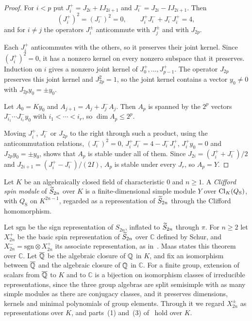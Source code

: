 \begin{proof}
For $i<p$ put $J_i^+=J_{2i}+IJ_{2i+1}$ and $J_i^-=J_{2i}-IJ_{2i+1}$. Then
\[
{(J_i^+)}^2={(J_i^-)}^2=0,\qquad J_i^+J_i^-+J_i^-J_i^+=4,
\]
and for $i\ne j$ the operators $J_i^\pm$ anticommute with $J_j^\pm$ and with $J_{2p}$.

Each $J_i^+$ anticommutes with the others, so it preserves their joint kernel. Since ${(J_i^+)}^2=0$, it has a nonzero kernel on every nonzero subspace that it preserves. Induction on $i$ gives a nonzero joint kernel of $J_0^+,\dots,J_{p-1}^+$. The operator $J_{2p}$ preserves this joint kernel and $J_{2p}^2=1$, so the joint kernel contains a vector $y_0\ne0$ with $J_{2p}y_0=\pm y_0$.

Let $A_0=Ky_0$ and $A_{j+1}=A_j+J_j^-A_j$. Then $A_p$ is spanned by the $2^p$ vectors $J_{i_1}^-\cdots J_{i_r}^-y_0$ with $i_1<\cdots<i_r$, so $\dim A_p\le2^p$.

Moving $J_i^+$, $J_i^-$ or $J_{2p}$ to the right through such a product, using the anticommutation relations, ${(J_i^-)}^2=0$, $J_i^+J_i^-=4-J_i^-J_i^+$, $J_i^+y_0=0$ and $J_{2p}y_0=\pm y_0$, shows that $A_p$ is stable under all of them. Since $J_{2i}=(J_i^++J_i^-)/2$ and $J_{2i+1}=(J_i^+-J_i^-)/(2I)$, $A_p$ is stable under every $J_r$, so $A_p=Y$.
\end{proof}

\begin{definition}\label{def:basicspin}
Let $K$ be an algebraically closed field of characteristic $0$ and $n\ge1$. A \emph{Clifford spin module} of $\widetilde{S}_{2n}$ over $K$ is a finite-dimensional simple module $Y$ over $\operatorname{Cl}_K(Q_{\mathrm S})$, with $Q_{\mathrm S}$ on $K^{2n-1}$, regarded as a representation of $\widetilde{S}_{2n}$ through the Clifford homomorphism.
\end{definition}

Let $\mathrm{sgn}$ be the sign representation of $S_{2n}$, inflated to $\widetilde{S}_{2n}$ through $\pi$. For $n\ge2$ let $X_{2n}^+$ be the basic spin representation of $\widetilde{S}_{2n}$ over $\mathbb C$ defined by Schur, and $X_{2n}^-=\mathrm{sgn}\otimes X_{2n}^+$ its associate representation, as in~\cite[Thm.~1]{Maas10}. Maas states this theorem over $\mathbb C$. Let $\overline{\mathbb{Q}}$ be the algebraic closure of $\mathbb{Q}$ in $K$, and fix an isomorphism between $\overline{\mathbb{Q}}$ and the algebraic closure of $\mathbb{Q}$ in $\mathbb C$. For a finite group, extension of scalars from $\overline{\mathbb{Q}}$ to $K$ and to $\mathbb C$ is a bijection on isomorphism classes of irreducible representations, since the three group algebras are split semisimple with as many simple modules as there are conjugacy classes, and it preserves dimensions, kernels and minimal polynomials of group elements. Through it we regard $X_{2n}^\pm$ as representations over $K$, and parts~(1) and~(3) of~\cite[Thm.~1]{Maas10} hold over $K$.

